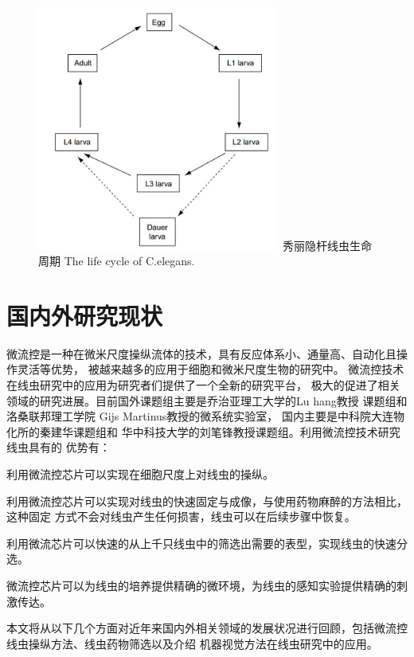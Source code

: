 	\begin{figure}[h]
	  \centering
	  \includegraphics[width=8cm]{figure/chap1/lifecycle.jpg}
	  \bicaption
		{秀丽隐杆线虫生命周期}
		{The life cycle of C.elegans.}
	  \label{fig:lifecycle}
	\end{figure}
	
\section{国内外研究现状}
\label{sec:intro:analog}
	微流控是一种在微米尺度操纵流体的技术，具有反应体系小、通量高、自动化且操作灵活等优势，
	被越来越多的应用于细胞和微米尺度生物的研究中。
	微流控技术在线虫研究中的应用为研究者们提供了一个全新的研究平台，
	极大的促进了相关领域的研究进展。目前国外课题组主要是乔治亚理工大学的Lu hang教授
	课题组和洛桑联邦理工学院
	Gijs Martinus教授的微系统实验室，
	国内主要是中科院大连物化所的秦建华课题组和
	华中科技大学的刘笔锋教授课题组。利用微流控技术研究线虫具有的
	优势有：\begin{enumerate*}[label=\arabic*.]
	\item 利用微流控芯片可以实现在细胞尺度上对线虫的操纵。\quad
	\item 利用微流控芯片可以实现对线虫的快速固定与成像，与使用药物麻醉的方法相比，这种固定
		方式不会对线虫产生任何损害，线虫可以在后续步骤中恢复。\quad
	\item 利用微流芯片可以快速的从上千只线虫中的筛选出需要的表型，实现线虫的快速分选。\quad
	\item 微流控芯片可以为线虫的培养提供精确的微环境，为线虫的感知实验提供精确的刺激传达。\quad
\end{enumerate*}
	本文将从以下几个方面对近年来国内外相关领域的发展状况进行回顾，包括微流控线虫操纵方法、线虫药物筛选以及介绍
	机器视觉方法在线虫研究中的应用。
